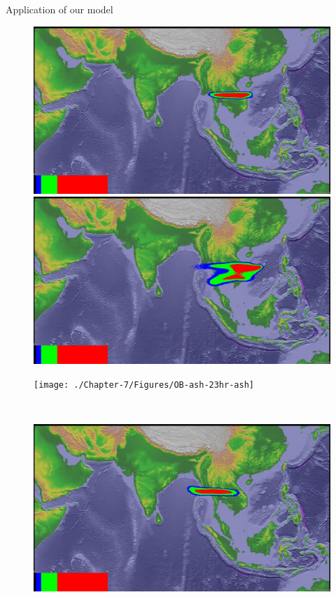 \documentclass{beamer}
\begin{document}
\begin{frame}{Application of our model}
\begin{figure}[!htb]
    \centering
    \begin{minipage}{.295\textwidth}
        \centering
        \includegraphics[width=0.99 \textwidth]{./Chapter-7/Figures/bent-23hr-ash}
    \end{minipage}%
    \begin{minipage}{.295\textwidth}
        \centering
        \includegraphics[width=0.99 \textwidth]{./Chapter-7/Figures/SPH-Plume-23hr-ash}
    \end{minipage}%
    \begin{minipage}{.295\textwidth}
        \centering
        \texttt{[image: ./Chapter-7/Figures/OB-ash-23hr-ash]}
    \end{minipage}%
    \\
        \begin{minipage}{.295\textwidth}
        \centering
        \includegraphics[width=0.99 \textwidth]{./Chapter-7/Figures/bent-31hr-ash}

\end{minipage}
\end{figure}
\end{frame}
\end{document}
